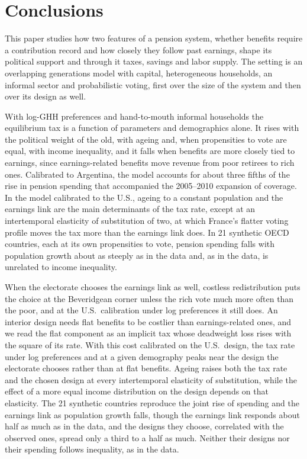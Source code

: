 \section{Conclusions}\label{sec:conclu}

This paper studies how two features of a pension system, whether benefits require a contribution record and how closely they follow past earnings, shape its political support and through it taxes, savings and labor supply. The setting is an overlapping generations model with capital, heterogeneous households, an informal sector and probabilistic voting, first over the size of the system and then over its design as well.

With log-GHH preferences and hand-to-mouth informal households the equilibrium tax is a function of parameters and demographics alone. It rises with the political weight of the old, with ageing and, when propensities to vote are equal, with income inequality, and it falls when benefits are more closely tied to earnings, since earnings-related benefits move revenue from poor retirees to rich ones. Calibrated to Argentina, the model accounts for about three fifths of the rise in pension spending that accompanied the 2005--2010 expansion of coverage. In the model calibrated to the U.S., ageing to a constant population and the earnings link are the main determinants of the tax rate, except at an intertemporal elasticity of substitution of two, at which France's flatter voting profile moves the tax more than the earnings link does. In 21 synthetic OECD countries, each at its own propensities to vote, pension spending falls with population growth about as steeply as in the data and, as in the data, is unrelated to income inequality.

When the electorate chooses the earnings link as well, costless redistribution puts the choice at the Beveridgean corner unless the rich vote much more often than the poor, and at the U.S.\ calibration under log preferences it still does. An interior design needs flat benefits to be costlier than earnings-related ones, and we read the flat component as an implicit tax whose deadweight loss rises with the square of its rate. With this cost calibrated on the U.S.\ design, the tax rate under log preferences and at a given demography peaks near the design the electorate chooses rather than at flat benefits. Ageing raises both the tax rate and the chosen design at every intertemporal elasticity of substitution, while the effect of a more equal income distribution on the design depends on that elasticity. The 21 synthetic countries reproduce the joint rise of spending and the earnings link as population growth falls, though the earnings link responds about half as much as in the data, and the designs they choose, correlated with the observed ones, spread only a third to a half as much. Neither their designs nor their spending follows inequality, as in the data.

